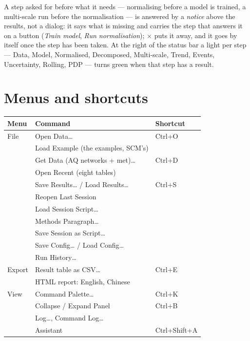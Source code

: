 \documentclass[11pt]{report}
\begin{document}
A step asked for before what it needs --- normalising before a model is trained, a
multi-scale run before the normalisation --- is answered by a \emph{notice} above the results, not a
dialog: it says what is missing and carries the step that answers it on a button
(\emph{Train model}, \emph{Run normalisation}); \(\times\) puts it away, and it goes by itself
once the step has been taken. At the right of the status bar a light per step --- Data,
Model, Normalised, Decomposed, Multi-scale, Trend, Events, Uncertainty, Rolling, PDP ---
turns green when that step has a result.

\section{Menus and shortcuts}
\begin{center}\small
\begin{tabular}{@{}lll@{}}
\toprule
Menu & Command & Shortcut \\
\midrule
File     & Open Data\ldots                      & Ctrl+O \\
         & Load Example (the examples, SCM's)   & \\
         & Get Data (AQ networks + met)\ldots & Ctrl+D \\
         & Open Recent (eight tables)           & \\
         & Save Results\ldots{} / Load Results\ldots & Ctrl+S \\
         & Reopen Last Session                  & \\
         & Load Session Script\ldots            & \\
         & Methods Paragraph\ldots              & \\
         & Save Session as Script\ldots         & \\
         & Save Config\ldots{} / Load Config\ldots & \\
         & Run History\ldots                    & \\
Export   & Result table as CSV\ldots            & Ctrl+E \\
         & HTML report: English, Chinese       & \\
View     & Command Palette\ldots                & Ctrl+K \\
         & Collapse / Expand Panel              & Ctrl+B \\
         & Log\ldots, Command Log\ldots       & \\
         & Assistant                            & Ctrl+Shift+A \\

\end{tabular}
\end{center}
\end{document}
